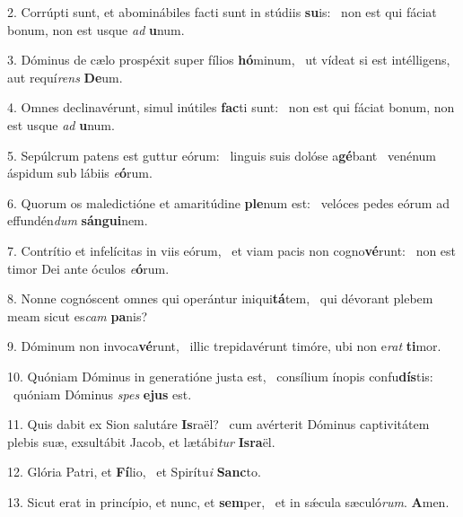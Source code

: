 2. Corrúpti sunt, et abominábiles facti sunt in stúdiis \textbf{su}is: \ast\  non est qui fáciat bonum, non est usque \textit{ad} \textbf{u}num.\

3. Dóminus de cælo prospéxit super fílios \textbf{hó}minum, \ast\  ut vídeat si est intélligens, aut requí\textit{rens} \textbf{De}um.\

4. Omnes declinavérunt, simul inútiles \textbf{fac}ti sunt: \ast\  non est qui fáciat bonum, non est usque \textit{ad} \textbf{u}num.\

5. Sepúlcrum patens est guttur eórum: \dag\  linguis suis dolóse a\textbf{gé}bant \ast\  venénum áspidum sub lábiis \textit{e}\textbf{ó}rum.\

6. Quorum os maledictióne et amaritúdine \textbf{ple}num est: \ast\  velóces pedes eórum ad effundén\textit{dum} \textbf{sán}\textbf{gui}nem.\

7. Contrítio et infelícitas in viis eórum, \dag\  et viam pacis non cogno\textbf{vé}runt: \ast\  non est timor Dei ante óculos \textit{e}\textbf{ó}rum.\

8. Nonne cognóscent omnes qui operántur iniqui\textbf{tá}tem, \ast\  qui dévorant plebem meam sicut es\textit{cam} \textbf{pa}nis?\

9. Dóminum non invoca\textbf{vé}runt, \ast\  illic trepidavérunt timóre, ubi non e\textit{rat} \textbf{ti}mor.\

10. Quóniam Dóminus in generatióne justa est, \dag\  consílium ínopis confu\textbf{dís}tis: \ast\  quóniam Dóminus \textit{spes} \textbf{e}\textbf{jus} est.\

11. Quis dabit ex Sion salutáre \textbf{Is}raël? \ast\  cum avérterit Dóminus captivitátem plebis suæ, exsultábit Jacob, et lætábi\textit{tur} \textbf{Is}\textbf{ra}ël.\

12. Glória Patri, et \textbf{Fí}lio, \ast\  et Spirítu\textit{i} \textbf{Sanc}to.\

13. Sicut erat in princípio, et nunc, et \textbf{sem}per, \ast\  et in sǽcula sæculó\textit{rum}. \textbf{A}men.\

